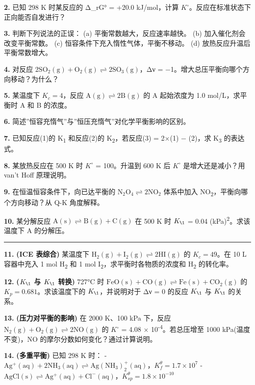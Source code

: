 \textbf{2.} 已知 298 K 时某反应的 Δ\_rG° = +20.0 kJ/mol，计算 \(K^{\circ}\)。反应在标准状态下正向能否自发进行？

\textbf{3.} 判断下列说法的正误：
(a) 平衡常数越大，反应速率越快。
(b) 加入催化剂会改变平衡常数。
(c) 恒容条件下充入惰性气体，平衡不移动。
(d) 放热反应升温后平衡常数增大。

\textbf{4.} 对反应 \(\mathrm{2SO_2(g) + O_2(g) \rightleftharpoons 2SO_3(g)}\)，Δν = −1。增大总压平衡向哪个方向移动？为什么？

\textbf{5.} 某温度下 \(K_c = 4\)，反应 \(\mathrm{A(g) \rightleftharpoons 2B(g)}\) 的 A 起始浓度为 1.0 mol/L，求平衡时 A 和 B 的浓度。

\textbf{6.} 简述''恒容充惰气''与''恒压充惰气''对化学平衡影响的区别。

\textbf{7.} 已知反应(1)的 K\textsubscript{1} 和反应(2)的 K\textsubscript{2}，若反应(3) = 2×(1) − (2)，求 K\textsubscript{3} 的表达式。

\textbf{8.} 某放热反应在 500 K 时 \(K^{\circ}\) = 100。升温到 600 K 后 \(K^{\circ}\) 是增大还是减小？用 van't Hoff 原理说明。

\textbf{9.} 在恒温恒容条件下，向已达平衡的 \(\mathrm{N_2O_4 \rightleftharpoons 2NO_2}\) 体系中加入 NO\textsubscript{2}，平衡向哪个方向移动？从 Q-K 角度解释。

\textbf{10.} 某分解反应 \(\mathrm{A(s) \rightleftharpoons B(g) + C(g)}\) 在 500 K 时 \(K_{\1}\) = 0.04 (kPa)\textsuperscript{2}。求该温度下 A 的分解压。

\begin{center}\rule{0.5\linewidth}{0.5pt}\end{center}

\textbf{11.} \textbf{(ICE 表综合)} 某温度下 \(\mathrm{H_2(g) + I_2(g) \rightleftharpoons 2HI(g)}\) 的 \(K_c = 49\)。在 10 L 容器中充入 1 mol H\textsubscript{2} 和 1 mol I\textsubscript{2}，求平衡时各物质的浓度和 H\textsubscript{2} 的转化率。

\textbf{12.} \textbf{(\(K_{\1}\) 与 \(K_{\1}\) 转换)} 727°C 时 \(\mathrm{FeO(s) + CO(g) \rightleftharpoons Fe(s) + CO_2(g)}\) 的 \(K_p = 0.681\)。求该温度下的 \(K_{\1}\)，并说明对于 Δν = 0 的反应 \(K_{\1}\) 与 \(K_{\1}\) 的关系。

\textbf{13.} \textbf{(压力对平衡的影响)} 在 2000 K、100 kPa 下，反应 \(\mathrm{N_2(g) + O_2(g) \rightleftharpoons 2NO(g)}\) 的 \(K^{\circ}\) = 4.08 × 10\textsuperscript{-4}。若总压增至 1000 kPa(温度不变)，NO 的摩尔分数如何变化？通过计算说明。

\textbf{14.} \textbf{(多重平衡)} 已知 298 K 时：
- \(\mathrm{Ag^+(aq) + 2NH_3(aq) \rightleftharpoons Ag(NH_3)_2^+(aq)}\)，\(K_f^\theta = 1.7 \times 10^7\)
- \(\mathrm{AgCl(s) \rightleftharpoons Ag^+(aq) + Cl^-(aq)}\)，\(K_{sp}^\theta = 1.8 \times 10^{-10}\)


